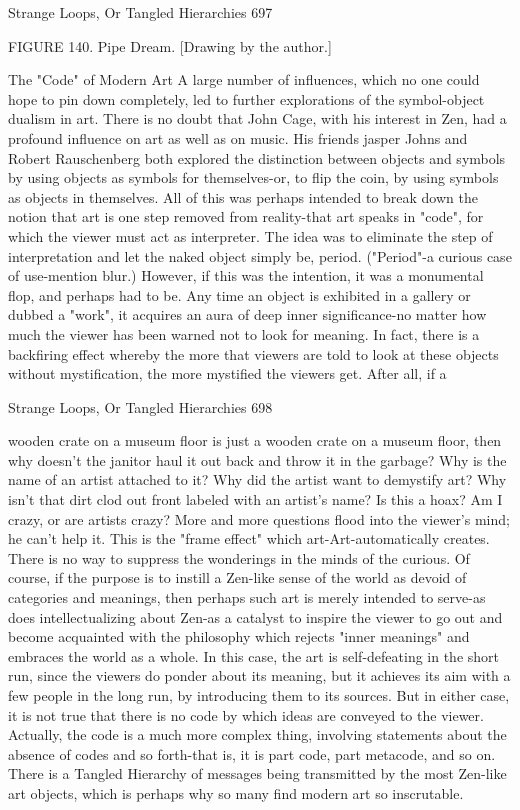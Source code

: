 Strange Loops, Or Tangled Hierarchies                                                     697

                  FIGURE 140. Pipe Dream. [Drawing by the author.]

                            The "Code" of Modern Art
A large number of influences, which no one could hope to pin down completely, led to
further explorations of the symbol-object dualism in art. There is no doubt that John
Cage, with his interest in Zen, had a profound influence on art as well as on music. His
friends jasper Johns and Robert Rauschenberg both explored the distinction between
objects and symbols by using objects as symbols for themselves-or, to flip the coin, by
using symbols as objects in themselves. All of this was perhaps intended to break down
the notion that art is one step removed from reality-that art speaks in "code", for which
the viewer must act as interpreter. The idea was to eliminate the step of interpretation and
let the naked object simply be, period. ("Period"-a curious case of use-mention blur.)
However, if this was the intention, it was a monumental flop, and perhaps had to be.
        Any time an object is exhibited in a gallery or dubbed a "work", it acquires an
aura of deep inner significance-no matter how much the viewer has been warned not to
look for meaning. In fact, there is a backfiring effect whereby the more that viewers are
told to look at these objects without mystification, the more mystified the viewers get.
After all, if a




Strange Loops, Or Tangled Hierarchies                                                   698

wooden crate on a museum floor is just a wooden crate on a museum floor, then why
doesn't the janitor haul it out back and throw it in the garbage? Why is the name of an
artist attached to it? Why did the artist want to demystify art? Why isn't that dirt clod out
front labeled with an artist's name? Is this a hoax? Am I crazy, or are artists crazy? More
and more questions flood into the viewer's mind; he can't help it. This is the "frame
effect" which art-Art-automatically creates. There is no way to suppress the wonderings
in the minds of the curious.
         Of course, if the purpose is to instill a Zen-like sense of the world as devoid of
categories and meanings, then perhaps such art is merely intended to serve-as does
intellectualizing about Zen-as a catalyst to inspire the viewer to go out and become
acquainted with the philosophy which rejects "inner meanings" and embraces the world
as a whole. In this case, the art is self-defeating in the short run, since the viewers do
ponder about its meaning, but it achieves its aim with a few people in the long run, by
introducing them to its sources. But in either case, it is not true that there is no code by
which ideas are conveyed to the viewer. Actually, the code is a much more complex
thing, involving statements about the absence of codes and so forth-that is, it is part code,
part metacode, and so on. There is a Tangled Hierarchy of messages being transmitted by
the most Zen-like art objects, which is perhaps why so many find modern art so
inscrutable.

